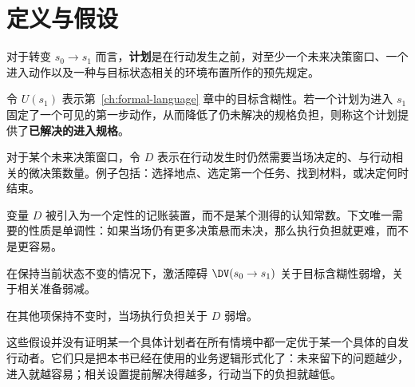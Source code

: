\section{定义与假设}

\begin{definition}[计划]
对于转变 $s_0 \to s_1$ 而言，\textbf{计划}是在行动发生之前，对至少一个未来决策窗口、一个进入动作以及一种与目标状态相关的环境布置所作的预先规定。
\end{definition}

\begin{definition}[已解决的进入规格]
令 $U(s_1)$ 表示第~\ref{ch:formal-language} 章中的目标含糊性。若一个计划为进入 $s_1$ 固定了一个可见的第一步动作，从而降低了仍未解决的规格负担，则称这个计划提供了\textbf{已解决的进入规格}。
\end{definition}

\begin{definition}[执行选择复杂度]
对于某个未来决策窗口，令 $D$ 表示在行动发生时仍然需要当场决定的、与行动相关的微决策数量。例子包括：选择地点、选定第一个任务、找到材料，或决定何时结束。
\end{definition}

\begin{remark}
变量 $D$ 被引入为一个定性的记账装置，而不是某个测得的认知常数。下文唯一需要的性质是单调性：如果当场仍有更多决策悬而未决，那么执行负担就更难，而不是更容易。
\end{remark}

\begin{axiom}[单调计划假设]
在保持当前状态不变的情况下，激活障碍 $\DV(s_0 \to s_1)$ 关于目标含糊性弱增，关于相关准备弱减。
\end{axiom}

\begin{axiom}[决策负载假设]
在其他项保持不变时，当场执行负担关于 $D$ 弱增。
\end{axiom}

\begin{discussion}
这些假设并没有证明某一个具体计划者在所有情境中都一定优于某一个具体的自发行动者。它们只是把本书已经在使用的业务逻辑形式化了：未来留下的问题越少，进入就越容易；相关设置提前解决得越多，行动当下的负担就越低。
\end{discussion}